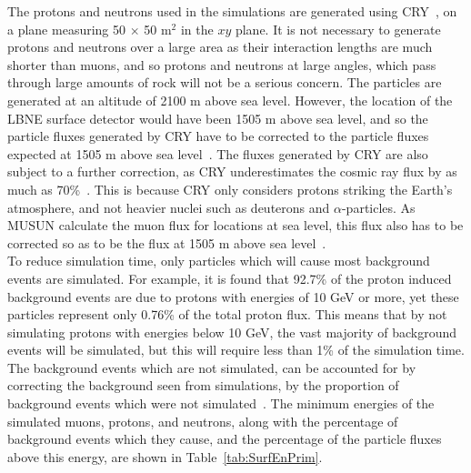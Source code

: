 The protons and neutrons used in the simulations are generated using CRY~\citep{CRY,CRY2}, on a plane measuring 50 $\times$ 50 m$^{2}$ in the $xy$ plane. It is not necessary to generate protons and neutrons over a large area as their interaction lengths are much shorter than muons, and so protons and neutrons at large angles, which pass through large amounts of rock will not be a serious concern. The particles are generated at an altitude of 2100 m above sea level. However, the location of the LBNE surface detector would have been 1505 m above sea level, and so the particle fluxes generated by CRY have to be corrected to the particle fluxes expected at 1505 m above sea level~\citep{MartinsThesis}. The fluxes generated by CRY are also subject to a further correction, as CRY underestimates the cosmic ray flux by as much as 70\%~\citep{LBNE7517}. This is because CRY only considers protons striking the Earth's atmosphere, and not heavier nuclei such as deuterons and $\alpha$-particles. As MUSUN calculate the muon flux for locations at sea level, this flux also has to be corrected so as to be the flux at 1505 m above sea level~\citep{MartinsThesis}. \\

To reduce simulation time, only particles which will cause most background events are simulated. For example, it is found that 92.7\% of the proton induced background events are due to protons with energies of 10 GeV or more, yet these particles represent only 0.76\% of the total proton flux. This means that by not simulating protons with energies below 10 GeV, the vast majority of background events will be simulated, but this will require less than 1\% of the simulation time. The background events which are not simulated, can be accounted for by correcting the background seen from simulations, by the proportion of background events which were not simulated~\citep{MartinsThesis}. The minimum energies of the simulated muons, protons, and neutrons, along with the percentage of background events which they cause, and the percentage of the particle fluxes above this energy, are shown in Table~\ref{tab:SurfEnPrim}. \\

